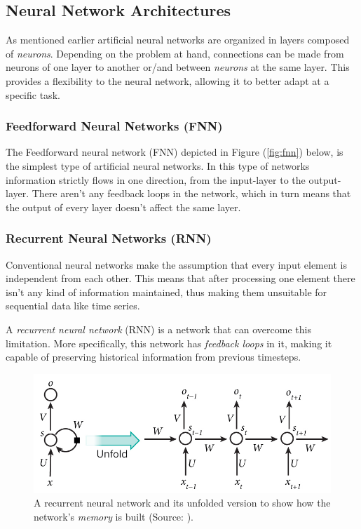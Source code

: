 \documentclass[a4paper, 12pt]{article}
\numberwithin{equation}{section}
\numberwithin{figure}{section}
\numberwithin{table}{section}
\begin{document}
	\subsection{Neural Network Architectures}
	
	As mentioned earlier artificial neural networks are organized in layers composed of \textit{neurons}. Depending on the problem at hand, connections can be made from neurons of one layer to another or/and between \textit{neurons} at the same layer. This provides a flexibility to the neural network, allowing it to better adapt at a specific task.
		
	\subsubsection{Feedforward Neural Networks (FNN)}
	
	The Feedforward neural network (FNN) depicted in Figure (\ref{fig:fnn}) below, is the simplest type of artificial neural networks. In this type of networks information strictly flows in one direction, from the input-layer to the output-layer. There aren't any feedback loops in the network, which in turn means that the output of every layer doesn't affect the same layer.
	
	
	
	\subsubsection{Recurrent Neural Networks (RNN)}
	
	Conventional neural networks make the assumption that every input element is independent from each other. This means that after processing one element there isn't any kind of information maintained, thus making them unsuitable for sequential data like time series.\par
	
	A \textit{recurrent neural network} (RNN) is a network that can overcome this limitation. More specifically, this network has \textit{feedback loops} in it, making it capable of preserving historical information from previous timesteps.
	
	\begin{figure}[H]
		\centering
		\includegraphics[scale=0.5, keepaspectratio]{rnn.png}
		\caption[Standard recurrent neural network]{A recurrent neural network and its unfolded version to show how the network's \textit{memory} is built (Source: \cite{nature_dl}).}
		\label{fig:rnn}
	\end{figure}
	
\end{document}
